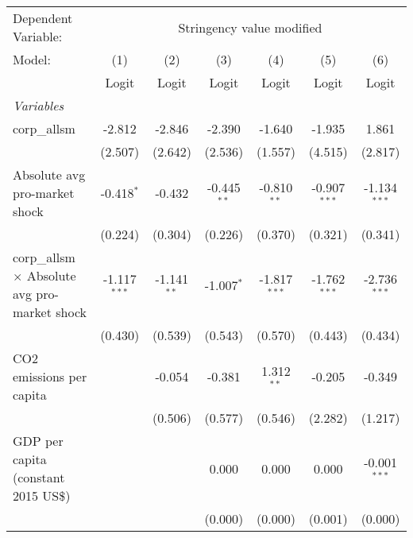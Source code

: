 
\begingroup
\centering
\begin{tabular}{lcccccc}
   \toprule
   Dependent Variable: & \multicolumn{6}{c}{Stringency value modified}\\
   Model:                                               & (1)            & (2)           & (3)           & (4)            & (5)             & (6)\\  
                                                        &  Logit         & Logit         & Logit         & Logit          & Logit           & Logit\\  
   \midrule
   \emph{Variables}\\
   corp\_allsm                                          & -2.812         & -2.846        & -2.390        & -1.640         & -1.935          & 1.861\\   
                                                        & (2.507)        & (2.642)       & (2.536)       & (1.557)        & (4.515)         & (2.817)\\   
   Absolute avg pro-market shock                        & -0.418$^{*}$   & -0.432        & -0.445$^{**}$ & -0.810$^{**}$  & -0.907$^{***}$  & -1.134$^{***}$\\   
                                                        & (0.224)        & (0.304)       & (0.226)       & (0.370)        & (0.321)         & (0.341)\\   
   corp\_allsm $\times$ Absolute avg pro-market shock   & -1.117$^{***}$ & -1.141$^{**}$ & -1.007$^{*}$  & -1.817$^{***}$ & -1.762$^{***}$  & -2.736$^{***}$\\   
                                                        & (0.430)        & (0.539)       & (0.543)       & (0.570)        & (0.443)         & (0.434)\\   
   CO2 emissions per capita                             &                & -0.054        & -0.381        & 1.312$^{**}$   & -0.205          & -0.349\\   
                                                        &                & (0.506)       & (0.577)       & (0.546)        & (2.282)         & (1.217)\\   
   GDP per capita (constant 2015 US\$)                  &                &               & 0.000         & 0.000          & 0.000           & -0.001$^{***}$\\   
                                                        &                &               & (0.000)       & (0.000)        & (0.001)         & (0.000)\\   

\end{tabular}
